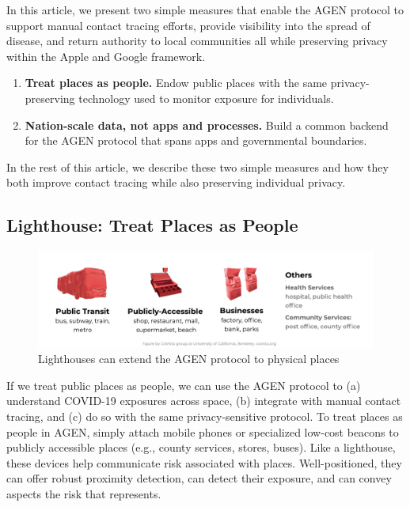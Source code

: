 In this article, we present two simple measures that enable the AGEN protocol to support manual contact tracing efforts, provide visibility into the spread of disease, and return authority to local communities all while preserving privacy within the Apple and Google framework. 
\begin{enumerate}
\item \textbf{Treat places as people.} Endow public places with the same privacy-preserving technology used to monitor exposure for individuals.
\item  \textbf{Nation-scale data, not apps and processes.} Build a common backend for the AGEN protocol that spans apps and governmental boundaries.
\end{enumerate}

In the rest of this article, we describe these two simple measures and how they both improve contact tracing while also preserving individual privacy.

\subsection*{Lighthouse: Treat Places as People}
\begin{figure}[h]
    \centering
    \includegraphics[width=\textwidth]{figs/places.pdf}
    \caption{Lighthouses can extend the AGEN protocol to physical places}
    \label{fig:placesExamples}
\end{figure}

If we treat public places as people, we can use the AGEN protocol to (a) understand COVID-19 exposures across space, (b) integrate with manual contact tracing, and (c) do so with the same privacy-sensitive protocol. To treat places as people in AGEN, simply attach mobile phones or specialized low-cost beacons to publicly accessible places (e.g., county services, stores, buses).  
Like a lighthouse, these devices help communicate risk associated with places.  
Well-positioned, they can offer robust proximity detection, can detect their exposure, and can convey aspects the risk that represents.

